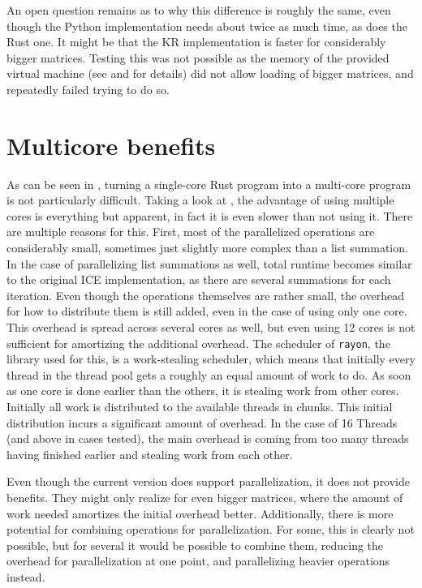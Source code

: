 An open question remains as to why this difference is roughly the same, even
though the Python implementation needs about twice as much time, as does the
Rust one. It might be that the KR implementation is faster for considerably
bigger matrices. Testing this was not possible as the memory of the provided
virtual machine (see  and  for details)
did not allow loading of bigger matrices, and repeatedly failed trying to do
so.



\section{Multicore benefits}\label{sec:multicore}



As can be seen in , turning a single-core Rust program into
a multi-core program is not particularly difficult. Taking a look at
, the advantage of using multiple cores is everything
but apparent, in fact it is even slower than not using it. There are multiple
reasons for this. First, most of the parallelized operations are considerably
small, sometimes just slightly more complex than a list summation. In the case
of parallelizing list summations as well, total runtime becomes similar to the
original ICE implementation, as there are several summations for each
iteration. Even though the operations themselves are rather small, the overhead
for how to distribute them is still added, even in the case of using only one
core. This overhead is spread across several cores as well, but even using 12
cores is not sufficient for amortizing the additional overhead. The scheduler
of \verb|rayon|, the library used for this, is a work-stealing scheduler,
which means that initially every thread in the thread pool gets a roughly an
equal amount of work to do. As soon as one core is done earlier than the
others, it is stealing work from other cores. Initially all work is distributed
to the available threads in chunks. This initial distribution incurs a
significant amount of overhead. In the case of 16 Threads (and above in cases
tested), the main overhead is coming from too many threads having finished
earlier and stealing work from each other.

Even though the current version does support parallelization, it does not
provide benefits. They might only realize for even bigger matrices, where the
amount of work needed amortizes the initial overhead better. Additionally,
there is more potential for combining operations for parallelization. For some,
this is clearly not possible, but for several it would be possible to combine
them, reducing the overhead for parallelization at one point, and parallelizing
heavier operations instead.

